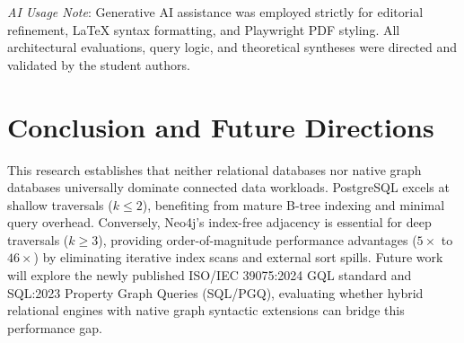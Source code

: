 \documentclass[conference,10pt]{IEEEtran}%
\begin{document}
\textit{AI Usage Note}: Generative AI assistance was employed strictly for editorial refinement, LaTeX syntax formatting, and Playwright PDF styling. All architectural evaluations, query logic, and theoretical syntheses were directed and validated by the student authors.

\section{Conclusion and Future Directions}
This research establishes that neither relational databases nor native graph databases universally dominate connected data workloads. PostgreSQL excels at shallow traversals ($k \le 2$), benefiting from mature B-tree indexing and minimal query overhead. Conversely, Neo4j's index-free adjacency is essential for deep traversals ($k \ge 3$), providing order-of-magnitude performance advantages ($5\times$ to $46\times$) by eliminating iterative index scans and external sort spills.
Future work will explore the newly published ISO/IEC 39075:2024 GQL standard and SQL:2023 Property Graph Queries (SQL/PGQ), evaluating whether hybrid relational engines with native graph syntactic extensions can bridge this performance gap.
\end{document}
